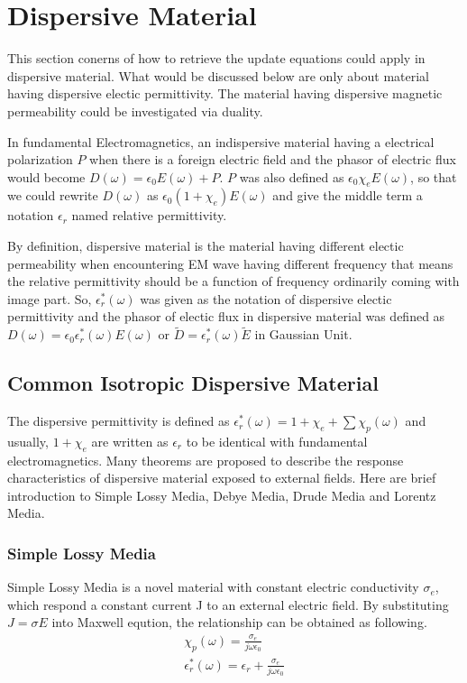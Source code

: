 \section{Dispersive Material}
\label{sec:dispersive}
This section conerns of how to retrieve the update equations could apply in dispersive material. What would be discussed
below are only about material having dispersive electic permittivity. The material having dispersive magnetic
permeability could be investigated via duality.

In fundamental Electromagnetics, an indispersive material having a electrical polarization $P$ when there is a foreign
electric field and the phasor of electric flux would become $D(\omega) = \epsilon_0 E(\omega) + P$. $P$ was also defined
as $\epsilon_0 \chi_e E(\omega)$, so that we could rewrite $D(\omega)$ as $\epsilon_0 (1+\chi_e)E(\omega)$ and give the middle term a notation
$\epsilon_r$ named relative permittivity.

By definition, dispersive material is the material having different electic permeability when encountering EM wave
having different frequency that means the relative permittivity should be a function of frequency ordinarily coming with
image part. So, $\epsilon_r^*(\omega)$ was given as the notation of dispersive electic permittivity and the phasor of
electic flux in dispersive material was defined as $D(\omega) = \epsilon_0 \epsilon_r^*(\omega)E(\omega)$ or
$\widetilde{D} = \epsilon_r^*(\omega)\widetilde{E}$ in Gaussian Unit.
\subsection{Common Isotropic Dispersive Material}
The dispersive permittivity is defined as $\epsilon_r^*(\omega) = 1 + \chi_e + \sum \chi_p(\omega)$ and usually, $1 +
\chi_e$ are written as $\epsilon_r$ to be identical with fundamental electromagnetics. Many theorems are proposed to
describe the response characteristics of dispersive material exposed to external fields. Here are brief introduction to
Simple Lossy Media, Debye Media, Drude Media and Lorentz Media.

\subsubsection{Simple Lossy Media}
Simple Lossy Media is a novel material with constant electric conductivity $\sigma_e$, which respond a constant current
J to an external electric field. By substituting $J=\sigma E$ into Maxwell eqution, the relationship can be obtained as
following.
\begin{gather}
  \chi_p(\omega) = \frac{\sigma_e}{j\omega\epsilon_0}\\
  \epsilon_r^*(\omega) = \epsilon_r + \frac{\sigma_e}{j\omega\epsilon_0}
\end{gather}

